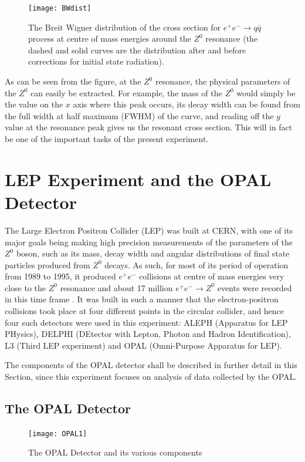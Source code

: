 \begin{figure}[H]
\centering
\texttt{[image: BWdist]}
\caption[Breit Wigner distribution of the cross section for $e^{+}e^{-}\rightarrow q\bar{q}$ process]{The Breit Wigner distribution of the cross section for $e^{+}e^{-}\rightarrow q\bar{q}$ process at centre of mass energies around the $Z^{0}$ resonance (the dashed and solid curves are the distribution after and before corrections for initial state radiation). \cite{thomson_2013}}
\label{fig:BWdist}
\end{figure}
As can be seen from the figure, at the $Z^{0}$ resonance, the physical parameters of the $Z^{0}$ can easily be extracted. For example, the mass of the $Z^{0}$ would simply be the value on the $x$ axis where this peak occurs, its decay width can be found from the full width at half maximum (FWHM) of the curve, and reading off the $y$ value at the resonance peak gives us the resonant cross section. This will in fact be one of the important tasks of the present experiment.

\section{LEP Experiment and the OPAL Detector}
The Large Electron Positron Collider (LEP) was built at CERN, with one of its major goals being making high precision measurements of the parameters of the $Z^{0}$ boson, such as its mass, decay width and angular distributions of final state particles produced from $Z^{0}$ decays. As such, for most of its period of operation from 1989 to 1995, it produced $e^{+}e^{-}$ collisions at centre of mass energies very close to the $Z^{0}$ resonance and about 17 million $e^{+}e^{-}\rightarrow Z^{0}$ events were recorded in this time frame \cite{thomson_2013}. It was built in such a manner that the electron-positron collisions took place at four different points in the circular collider, and hence four such detectors were used in this experiment: ALEPH (Apparatus for LEP PHysics), DELPHI (DEtector with Lepton, Photon and Hadron Identification), L3 (Third LEP experiment) and OPAL (Omni-Purpose Apparatus for LEP). 

The components of the OPAL detector shall be described in further detail in this Section, since this experiment focuses on analysis of data collected by the OPAL.

\subsection{The OPAL Detector}
\begin{figure}[H]
\centering
\texttt{[image: OPAL1]}
\caption[The OPAL Detector and its various components]{The OPAL Detector and its various components \cite{OPAL}}
\label{fig:OPAL}
\end{figure}

